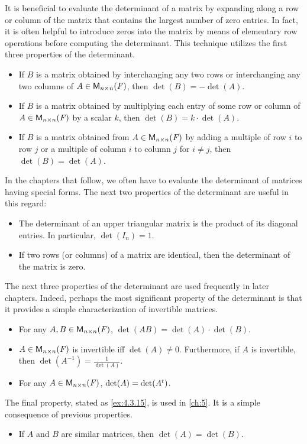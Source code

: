 \begin{note}
  It is beneficial to evaluate the determinant of a matrix by expanding along a row or column of the matrix that contains the largest number of zero entries.
  In fact, it is often helpful to introduce zeros into the matrix by means of elementary row operations before computing the determinant.
  This technique utilizes the first three properties of the determinant.
  \begin{itemize}
    \item If \(B\) is a matrix obtained by interchanging any two rows or interchanging any two columns of \(A \in \ms[n][n][\F]\), then \(\det(B) = -\det(A)\).
    \item If \(B\) is a matrix obtained by multiplying each entry of some row or column of \(A \in \ms[n][n][\F]\) by a scalar \(k\), then \(\det(B) = k \cdot \det(A)\).
    \item If \(B\) is a matrix obtained from \(A \in \ms[n][n][\F]\) by adding a multiple of row \(i\) to row \(j\) or a multiple of column \(i\) to column \(j\) for \(i \neq j\), then \(\det(B) = \det(A)\).
  \end{itemize}
  In the chapters that follow, we often have to evaluate the determinant of matrices having special forms.
  The next two properties of the determinant are useful in this regard:
  \begin{itemize}
    \item The determinant of an upper triangular matrix is the product of its diagonal entries.
          In particular, \(\det(I_n) = 1\).
    \item If two rows (or columns) of a matrix are identical, then the determinant of the matrix is zero.
  \end{itemize}
  The next three properties of the determinant are used frequently in later chapters.
  Indeed, perhaps the most significant property of the determinant is that it provides a simple characterization of invertible matrices.
  \begin{itemize}
    \item For any \(A, B \in \ms[n][n][\F]\), \(\det(AB) = \det(A) \cdot \det(B)\).
    \item \(A \in \ms[n][n][\F]\) is invertible iff \(\det(A) \neq 0\).
          Furthermore, if \(A\) is invertible, then \(\det(A^{-1}) = \frac{1}{\det(A)}\).
    \item For any \(A \in \ms[n][n][\F]\), \(\det(A) = \det({A}^{t})\).
  \end{itemize}
  The final property, stated as \cref{ex:4.3.15}, is used in \cref{ch:5}.
  It is a simple consequence of previous properties.
  \begin{itemize}
    \item If \(A\) and \(B\) are similar matrices, then \(\det(A) = \det(B)\).
  \end{itemize}
\end{note}

